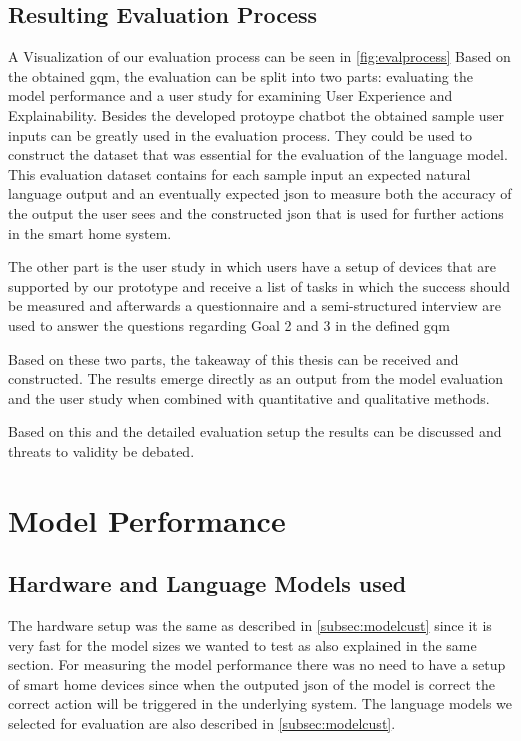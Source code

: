 \subsection{Resulting Evaluation Process}
A Visualization of our evaluation process can be seen in \cref{fig:evalprocess}
Based on the obtained \gls{gqm}, the evaluation can be split into two parts: evaluating the model performance and a user study for examining User Experience and Explainability.
Besides the developed protoype chatbot the obtained sample user inputs can be greatly used in the evaluation process.
They could be used to construct the dataset that was essential for the evaluation of the language model.
This evaluation dataset contains for each sample input an expected natural language output and an eventually expected \gls{json} to measure both the accuracy of the output the user sees and the constructed \gls{json} that is used for further actions in the smart home system.

The other part is the user study in which users have a setup of devices that are supported by our prototype and receive a list of tasks in which the success should be measured and afterwards a questionnaire and a semi-structured interview are used to answer the questions regarding Goal 2 and 3 in the defined \gls{gqm}

Based on these two parts, the takeaway of this thesis can be received and constructed.
The results emerge directly as an output from the model evaluation and the user study when combined with quantitative and qualitative methods.

Based on this and the detailed evaluation setup the results can be discussed and threats to validity be debated.


\section{Model Performance}
\label{sec:modelperform}


\subsection{Hardware and Language Models used}
The hardware setup was the same as described in \cref{subsec:modelcust} since it is very fast for the model sizes we wanted to test as also explained in the same section.
For measuring the model performance there was no need to have a setup of smart home devices since when the outputed \gls{json} of the model is correct the correct action will be triggered in the underlying system.
The language models we selected for evaluation are also described in \cref{subsec:modelcust}.

